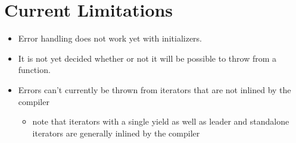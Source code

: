 \section{Current Limitations}

\begin{itemize}
\item Error handling does not work yet with initializers.
\item It is not yet decided whether or not it will be possible to
  throw from a  function.
\item Errors can't currently be thrown from iterators that are not inlined by
      the compiler
\begin{itemize}
\item note that iterators with a single yield as well as leader and standalone
    iterators are generally inlined by the compiler
\end{itemize}
\end{itemize}
